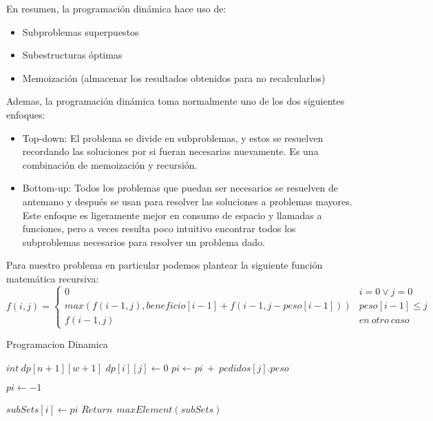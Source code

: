 En resumen, la programación dinámica hace uso de:
\begin{itemize}
	\item Subproblemas superpuestos
	\item Subestructuras óptimas
	\item Memoización (almacenar los resultados obtenidos para no recalcularlos)
\end{itemize}


Ademas, la programación dinámica toma normalmente uno de los dos siguientes enfoques:
\begin{itemize}
	\item Top-down: El problema se divide en subproblemas, y estos se resuelven recordando las soluciones por si fueran necesarias nuevamente. Es una combinación de memoización y recursión.
	\item Bottom-up: Todos los problemas que puedan ser necesarios se resuelven de antemano y después se usan para resolver las soluciones a problemas mayores. Este enfoque es ligeramente mejor en consumo de espacio y llamadas a funciones, pero a veces resulta poco intuitivo encontrar todos los subproblemas necesarios para resolver un problema dado.
\end{itemize}

Para nuestro problema en particular podemos plantear la siguiente función matemática recursiva:
\begin{equation*}
f(i,j) = \begin{cases}
          0 & i = 0 \lor j = 0 \\
          max(f(i-1,j), beneficio[i-1] + f(i-1, j-peso[i-1])) & peso[i-1] \leq j \\
          f(i-1, j) & en\ otro\ caso
       \end{cases}
\end{equation*}

\begin{algorithm}
\caption{Programacion Dinamica}\label{selection}
\begin{algorithmic}[1]
	\State $int \ dp[n+1][w+1]$
    	\State $dp[i][j] \gets 0$
	\State $pi \gets pi\ +\ pedidos[j].peso$
	\EndIf
	\EndFor

	\State $pi \gets -1$
	\EndIf

	\State $subSets[i] \gets pi $
    \EndFor
   	\State $Return \ \ maxElement(subSets)$
\EndProcedure
\end{algorithmic}
\end{algorithm}
